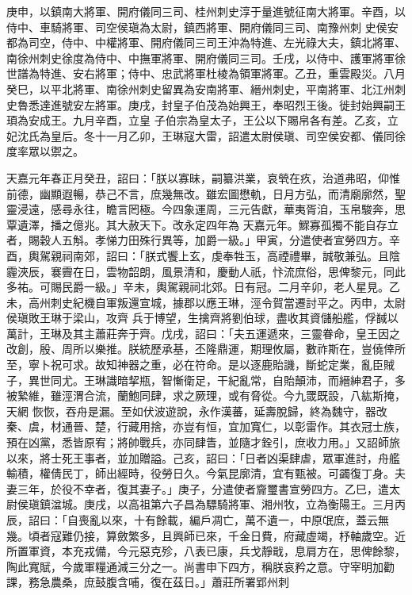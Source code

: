 \begin{pinyinscope}
 庚申，以鎮南大將軍、開府儀同三司、桂州刺史淳于量進號征南大將軍。辛酉，以侍中、車騎將軍、司空侯瑱為太尉，鎮西將軍、開府儀同三司、南豫州刺
 史侯安都為司空，侍中、中權將軍、開府儀同三司王沖為特進、左光祿大夫，鎮北將軍、南徐州刺史徐度為侍中、中撫軍將軍、開府儀同三司。壬戌，以侍中、護軍將軍徐世譜為特進、安右將軍；侍中、忠武將軍杜棱為領軍將軍。乙丑，重雲殿災。八月癸巳，以平北將軍、南徐州刺史留異為安南將軍、縉州刺史，平南將軍、北江州刺史魯悉達進號安左將軍。庚戌，封皇子伯茂為始興王，奉昭烈王後。徙封始興嗣王頊為安成王。九月辛酉，立皇
 子伯宗為皇太子，王公以下賜帛各有差。乙亥，立妃沈氏為皇后。冬十一月乙卯，王琳寇大雷，詔遣太尉侯瑱、司空侯安都、儀同徐度率眾以禦之。



 天嘉元年春正月癸丑，詔曰：「朕以寡昧，嗣纂洪業，哀煢在疚，治道弗昭，仰惟前德，幽顯遐暢，恭己不言，庶幾無改。雖宏圖懋軌，日月方弘，而清廟廓然，聖靈浸遠，感尋永往，瞻言罔極。今四象運周，三元告獻，華夷胥洎，玉帛駿奔，思覃遺澤，播之億兆。其大赦天下。改永定四年為
 天嘉元年。鰥寡孤獨不能自存立者，賜穀人五斛。孝悌力田殊行異等，加爵一級。」甲寅，分遣使者宣勞四方。辛酉，輿駕親祠南郊，詔曰：「朕式饗上玄，虔奉牲玉，高禋禮畢，誠敬兼弘。且陰霾浹辰，褰霽在日，雲物韶朗，風景清和，慶動人祇，忭流庶俗，思俾黎元，同此多祐。可賜民爵一級。」辛未，輿駕親祠北郊。日有冠。二月辛卯，老人星見。乙未，高州刺史紀機自軍叛還宣城，據郡以應王琳，涇令賀當遷討平之。丙申，太尉侯瑱敗王琳于梁山，攻齊
 兵于博望，生擒齊將劉伯球，盡收其資儲船艦，俘馘以萬計，王琳及其主蕭莊奔于齊。戊戌，詔曰：「夫五運遞來，三靈眷命，皇王因之改創，殷、周所以樂推。朕統歷承基，丕隆鼎運，期理攸屬，數祚斯在，豈僥倖所至，寧卜祝可求。故知神器之重，必在符命。是以逐鹿貽譏，斷蛇定業，亂臣賊子，異世同尤。王琳識暗挈瓶，智慚衛足，干紀亂常，自貽顛沛，而縉紳君子，多被縶維，雖涇渭合流，蘭鮑同肆，求之厥理，或有脅從。今九罭既設，八紘斯掩，天網
 恢恢，吞舟是漏。至如伏波遊說，永作漢蕃，延壽脫歸，終為魏守，器改秦、虞，材通晉、楚，行藏用捨，亦豈有恒，宜加寬仁，以彰雷作。其衣冠士族，預在凶黨，悉皆原宥；將帥戰兵，亦同肆眚，並隨才銓引，庶收力用。」又詔師旅以來，將士死王事者，並加贈謚。己亥，詔曰：「日者凶渠肆虐，眾軍進討，舟艦輸積，權倩民丁，師出經時，役勞日久。今氣昆廓清，宜有甄被。可蠲復丁身。夫妻三年，於役不幸者，復其妻子。」庚子，分遣使者齎璽書宣勞四方。乙巳，遣太
 尉侯瑱鎮湓城。庚戌，以高祖第六子昌為驃騎將軍、湘州牧，立為衡陽王。三月丙辰，詔曰：「自喪亂以來，十有餘載，編戶凋亡，萬不遺一，中原氓庶，蓋云無幾。頃者寇難仍接，算斂繁多，且興師已來，千金日費，府藏虛竭，杼軸歲空。近所置軍資，本充戎備，今元惡克殄，八表已康，兵戈靜戢，息肩方在，思俾餘黎，陶此寬賦，今歲軍糧通減三分之一。尚書申下四方，稱朕哀矜之意。守宰明加勸課，務急農桑，庶鼓腹含哺，復在茲日。」蕭莊所署郢州刺

\end{pinyinscope}
